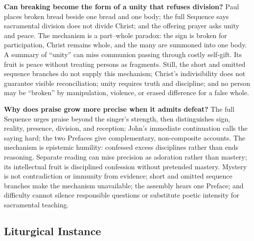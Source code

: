 \begin{deepstudy}
\noindent\textbf{Can breaking become the form of a unity that refuses division?\enspace{}}
Paul places broken bread beside one bread and one body; the full Sequence says sacramental division does not divide Christ; and the offering prayer asks unity and peace. The mechanism is a part--whole paradox: the sign is broken for participation, Christ remains whole, and the many are summoned into one body. A summary of “unity” can miss communion passing through costly self-gift. Its fruit is peace without treating persons as fragments. Still, the short and omitted sequence branches do not supply this mechanism; Christ's indivisibility does not guarantee visible reconciliation; unity requires truth and discipline; and no person may be “broken” by manipulation, violence, or erased difference for a false whole.

\noindent\textbf{Why does praise grow more precise when it admits defeat?\enspace{}}
The full Sequence urges praise beyond the singer's strength, then distinguishes sign, reality, presence, division, and reception; John's immediate continuation calls the saying hard; the two Prefaces give complementary, non-composite accounts. The mechanism is epistemic humility: confessed excess disciplines rather than ends reasoning. Separate reading can miss precision as adoration rather than mastery; its intellectual fruit is disciplined confession without pretended mastery. Mystery is not contradiction or immunity from evidence; short and omitted sequence branches make the mechanism unavailable; the assembly hears one Preface; and difficulty cannot silence responsible questions or substitute poetic intensity for sacramental teaching.

\clearpage

\pcresolutionappendix

\subsection*{Liturgical Instance}


\end{deepstudy}
